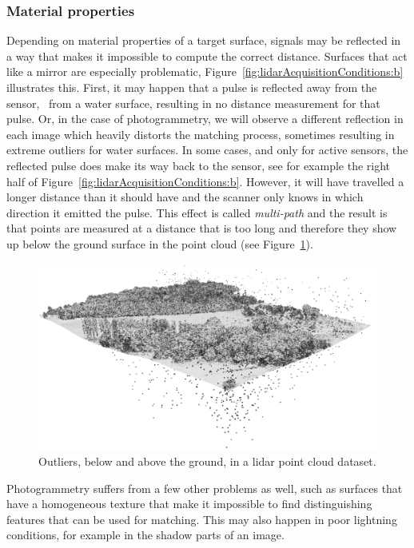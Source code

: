 \subsubsection{Material properties}
Depending on material properties of a target surface, signals may be reflected in a way that makes it impossible to compute the correct distance. 
Surfaces that act like a mirror are especially problematic, Figure~\ref{fig:lidarAcquisitionConditions:b} illustrates this. 
First, it may happen that a pulse is reflected away from the sensor, \eg\ from a water surface, resulting in no distance measurement for that pulse. 
Or, in the case of photogrammetry, we will observe a different reflection in each image which heavily distorts the matching process, sometimes resulting in extreme outliers for water surfaces.  
In some cases, and only for active sensors, the reflected pulse does make its way back to the sensor, see for example the right half of Figure~\ref{fig:lidarAcquisitionConditions:b}. 
However, it will have travelled a longer distance than it should have and the scanner only knows in which direction it emitted the pulse. 
This effect is called \emph{multi-path} and the result is that points are measured at a distance that is too long and therefore they show up below the ground surface in the point cloud (see Figure~\ref{fig:outliers}).  
\begin{figure}
	\centering
	\includegraphics[width=\textwidth]{figs/outliers.png}
	\caption{Outliers, below and above the ground, in a lidar point cloud dataset.}
	\label{fig:outliers}
\end{figure}

Photogrammetry suffers from a few other problems as well, such as surfaces that have a homogeneous texture that make it impossible to find distinguishing features that can be used for matching. 
This may also happen in poor lightning conditions, for example in the shadow parts of an image.

